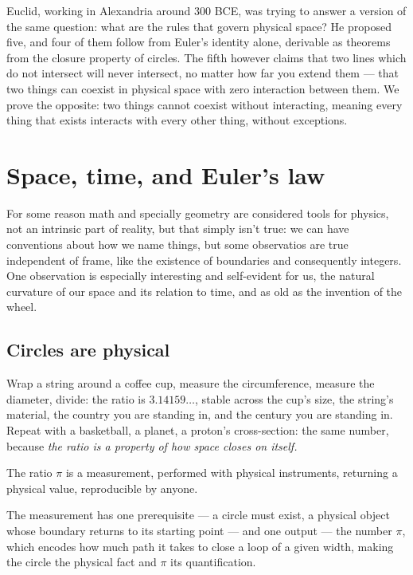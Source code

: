\documentclass[12pt]{article}
\begin{document}
Euclid, working in Alexandria around 300 BCE, was trying to answer a version of the same question: what are the rules that govern physical space? He proposed five, and four of them follow from Euler's identity alone, derivable as theorems from the closure property of circles. The fifth however claims that two lines which do not intersect will never intersect, no matter how far you extend them --- that two things can coexist in physical space with zero interaction between them. We prove the opposite: two things cannot coexist without interacting, meaning every thing that exists interacts with every other thing, without exceptions.

\section{Space, time, and Euler's law}

For some reason math and specially geometry are considered tools for physics, not an intrinsic part of reality, but that simply isn't true: we can have conventions about how we name things, but some observatios are true independent of frame, like the existence of boundaries and consequently integers. One observation is especially interesting and self-evident for us, the natural curvature of our space and its relation to time, and as old as the invention of the wheel.

\subsection{Circles are physical}

Wrap a string around a coffee cup, measure the circumference, measure the diameter, divide: the ratio is $3.14159\ldots$, stable across the cup's size, the string's material, the country you are standing in, and the century you are standing in. Repeat with a basketball, a planet, a proton's cross-section: the same number, because \textit{the ratio is a property of how space closes on itself.} 

The ratio $\pi$ is a measurement, performed with physical instruments, returning a physical value, reproducible by anyone. 

The measurement has one prerequisite --- a circle must exist, a physical object whose boundary returns to its starting point --- and one output --- the number $\pi$, which encodes how much path it takes to close a loop of a given width, making the circle the physical fact and $\pi$ its quantification.
\end{document}
